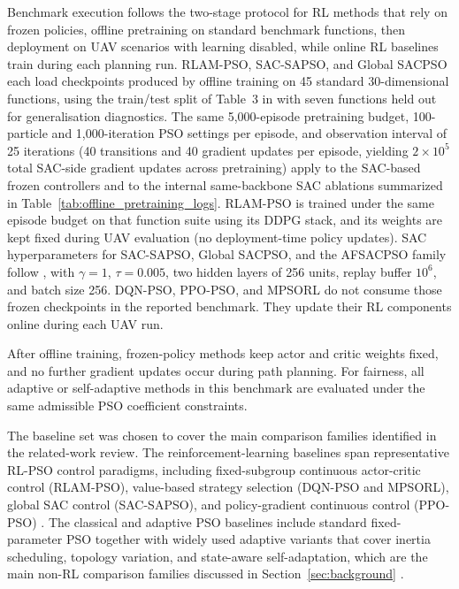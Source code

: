 \documentclass[final,5p,times]{elsarticle}
\begin{document}
Benchmark execution follows the two-stage protocol for RL methods that rely on frozen policies, offline pretraining on standard benchmark functions, then deployment on UAV scenarios with learning disabled, while online RL baselines train during each planning run.
RLAM-PSO, SAC-SAPSO, and Global SACPSO each load checkpoints produced by offline training on 45 standard 30-dimensional functions, using the train/test split of Table~3 in \cite{vonEschwege2024Soft} with seven functions held out for generalisation diagnostics.
The same 5{,}000-episode pretraining budget, 100-particle and 1{,}000-iteration PSO settings per episode, and observation interval of 25 iterations (40 transitions and 40 gradient updates per episode, yielding $2\times10^5$ total SAC-side gradient updates across pretraining) apply to the SAC-based frozen controllers and to the internal same-backbone SAC ablations summarized in Table~\ref{tab:offline_pretraining_logs}.
RLAM-PSO is trained under the same episode budget on that function suite using its DDPG stack, and its weights are kept fixed during UAV evaluation (no deployment-time policy updates).
SAC hyperparameters for SAC-SAPSO, Global SACPSO, and the AFSACPSO family follow \cite{vonEschwege2024Soft}, with $\gamma=1$, $\tau=0.005$, two hidden layers of 256 units, replay buffer $10^6$, and batch size 256.
DQN-PSO, PPO-PSO, and MPSORL do not consume those frozen checkpoints in the reported benchmark. They update their RL components online during each UAV run.

After offline training, frozen-policy methods keep actor and critic weights fixed, and no further gradient updates occur during path planning.
For fairness, all adaptive or self-adaptive methods in this benchmark are evaluated under the same admissible PSO coefficient constraints.

The baseline set was chosen to cover the main comparison families identified in the related-work review. The reinforcement-learning baselines span representative RL-PSO control paradigms, including fixed-subgroup continuous actor-critic control (RLAM-PSO), value-based strategy selection (DQN-PSO and MPSORL), global SAC control (SAC-SAPSO), and policy-gradient continuous control (PPO-PSO) \cite{Yin2023RLAMPSO, Aoun2024Deep, Meng2023Multistrategy, vonEschwege2024Soft, Klein2024Optimizing}. The classical and adaptive PSO baselines include standard fixed-parameter PSO together with widely used adaptive variants that cover inertia scheduling, topology variation, and state-aware self-adaptation, which are the main non-RL comparison families discussed in Section~\ref{sec:background} \cite{Bansal2011Inertia, Clerc2002The, Liu2025A, Isiet2019Selfadapting}.
\end{document}

